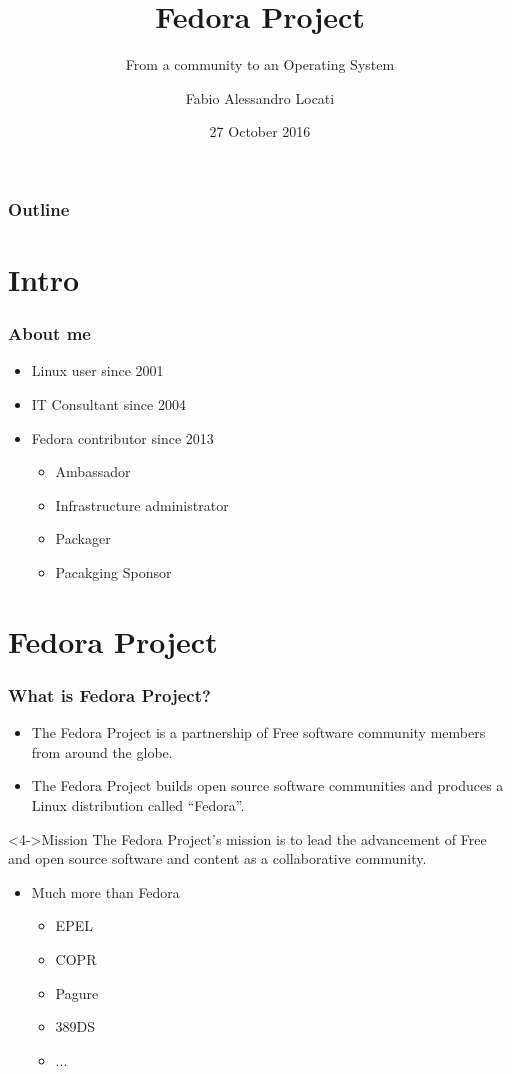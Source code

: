 \documentclass[t,aspectratio=169]{beamer}
\title{Fedora Project}
\subtitle{From a community to an Operating System}
\author{Fabio Alessandro Locati}
\date{27 October 2016}
\begin{document}
\maketitle

\begin{frame}
    \frametitle{Outline}
    \tableofcontents
\end{frame}

\section{Intro}
\begin{frame}
    \frametitle{About me} 
    \begin{itemize}
        \item<2-> Linux user since 2001
        \item<3-> IT Consultant since 2004
        \item<4-> Fedora contributor since 2013 
        \begin{itemize}
            \item<5-> Ambassador
            \item<5-> Infrastructure administrator
            \item<5-> Packager
            \item<5-> Pacakging Sponsor
        \end{itemize}
    \end{itemize}
\end{frame}

\section{Fedora Project}
\begin{frame}
    \frametitle{What is Fedora Project?}
    \begin{itemize}
        \item<2-> The Fedora Project is a partnership of Free software community members from around the globe.
        \item<3-> The Fedora Project builds open source software communities and produces a Linux distribution called ``Fedora''.
    \end{itemize}
    \begin{block}<4->{Mission}
        The Fedora Project's mission is to lead the advancement of Free and open source software and content as a collaborative community.
    \end{block}
    \begin{itemize}
        \item<5-> Much more than Fedora
        \begin{itemize} 
            \item<5-> EPEL 
            \item<5-> COPR
            \item<5-> Pagure
            \item<5-> 389DS
            \item<5-> ...
        \end{itemize}
    \end{itemize}
\end{frame}
\end{document}
